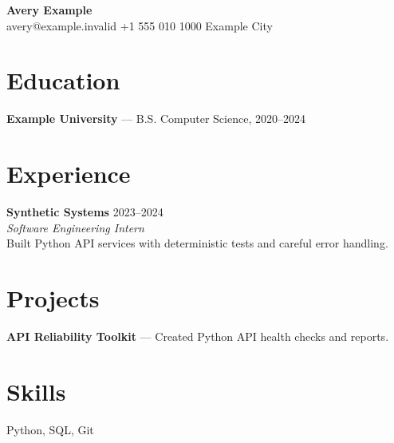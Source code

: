 \documentclass[11pt]{article}
\begin{document}
\begin{center}
  {\Large\bfseries Avery Example}\\
  avery@example.invalid \quad +1 555 010 1000 \quad Example City
\end{center}

\section*{Education}
\textbf{Example University} --- B.S. Computer Science, 2020--2024

\section*{Experience}
\textbf{Synthetic Systems} \hfill 2023--2024\\
\textit{Software Engineering Intern}\\
Built Python API services with deterministic tests and careful error handling.

\section*{Projects}
\textbf{API Reliability Toolkit} --- Created Python API health checks and reports.

\section*{Skills}
Python, SQL, Git
\end{document}
